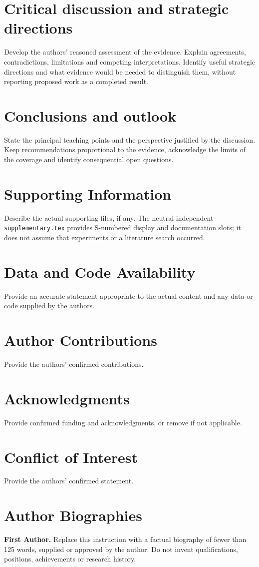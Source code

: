 \documentclass[letterpaper,12pt]{article}
\begin{document}
\section{Critical discussion and strategic directions}
Develop the authors' reasoned assessment of the evidence. Explain
agreements, contradictions, limitations and competing interpretations.
Identify useful strategic directions and what evidence would be needed to
distinguish them, without reporting proposed work as a completed result.

\section{Conclusions and outlook}
State the principal teaching points and the perspective justified by the
discussion. Keep recommendations proportional to the evidence, acknowledge
the limits of the coverage and identify consequential open questions.

\section*{Supporting Information}
Describe the actual supporting files, if any. The neutral independent
\texttt{supplementary.tex} provides S-numbered display and documentation
slots; it does not assume that experiments or a literature search occurred.
\section*{Data and Code Availability}
Provide an accurate statement appropriate to the actual content and any
data or code supplied by the authors.
\section*{Author Contributions}
Provide the authors' confirmed contributions.
\section*{Acknowledgments}
Provide confirmed funding and acknowledgments, or remove if not applicable.
\section*{Conflict of Interest}
Provide the authors' confirmed statement.

\section*{Author Biographies}
\noindent\textbf{First Author.} Replace this instruction with a factual
biography of fewer than 125 words, supplied or approved by the author.
Do not invent qualifications, positions, achievements or research history.
\end{document}
